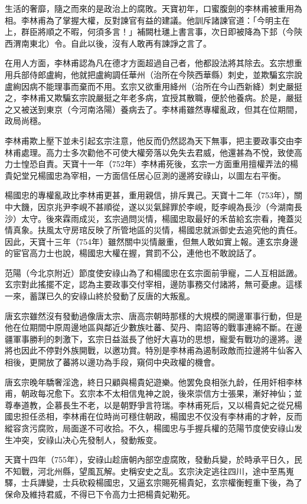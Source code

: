 生活的奢靡，隨之而來的是政治上的腐敗。天寶初年，口蜜腹劍的李林甫被重用為相。李林甫為了掌握大權，反對諫官有益的建議。他訓斥諸諫官道：「今明主在上，群臣將順之不暇，何須多言！」補闕杜璡上書言事，次日即被降為下邽（今陝西渭南東北）令。自此以後，沒有人敢再有諫諍之言了。

在用人方面，李林甫認為凡在德才方面超過自己者，他都設法將其除去。玄宗想重用兵部侍郎盧絢，他就把盧絢調任華州（治所在今陝西華縣）刺史，並欺騙玄宗說盧絢因病不能理事而棄而不用。玄宗又欲重用絳州（治所在今山西新絳）刺史嚴挺之，李林甫又欺騙玄宗說嚴挺之年老多病，宜授其散職，便於他養病。於是，嚴挺之又被送到東京（今河南洛陽）養病去了。李林甫雖然專權亂政，但其在位期間，政局尚穩。

李林甫欺上壓下並未引起玄宗注意，他反而仍然認為天下無事，把主要政事交由李林甫處理。高力士多次勸他不可使大權旁落以免失去君威，他還甚為不悅，致使高力士惶恐自責。天寶十一年（752年）李林甫死後，玄宗一方面重用擅權弄法的楊貴妃堂兄楊國忠為宰相，一方面信任居心叵測的邊將安祿山，以圖左右平衡。

楊國忠的專權亂政比李林甫更甚，重用親信，排斥異己。天寶十二年（753年），關中大饑，因京兆尹李峴不甚順從，遂以災氣歸罪於李峴，貶李峴為長沙（今湖南長沙）太守。後來霖雨成災，玄宗過問災情，楊國忠取最好的禾苗給玄宗看，掩蓋災情真象。扶風太守房琯反映了所管地區的災情，楊國忠就派御史去追究他的責任。因此，天寶十三年（754年）雖然關中災情嚴重，但無人敢如實上報。連玄宗身邊的宦官高力士也說，楊國忠大權在握，賞罰不公，連他也不敢說話了。

范陽（今北京附近）節度使安祿山為了和楊國忠在玄宗面前爭寵，二人互相詆譭。玄宗對此搖擺不定，認為主要政事交付宰相，邊防事務交付諸將，無可憂慮。這樣一來，蓄謀已久的安祿山終於發動了反唐的大叛亂。

唐玄宗雖然沒有發動過像唐太宗、唐高宗朝時那樣的大規模的開邊軍事行動，但是他在位期間中原周邊地區與鄰近少數族吐蕃、契丹、南詔等的戰事連綿不斷。在邊疆軍事勝利的刺激下，玄宗日益滋長了他好大喜功的思想，寵愛有戰功的邊將。邊將也因此不停對外族開戰，以邀功賞。特別是李林甫為遏制政敵而拉邊將牛仙客入相後，更開放了蕃將以邊功為手段，窺伺中央政權的機會。

唐玄宗晚年驕奢淫逸，終日只顧與楊貴妃遊樂。他罢免良相张九龄，任用奸相李林甫，朝政每况愈下。玄宗本不太相信鬼神之說，後來崇信方士張果，漸好神仙；並尊奉道教，企慕長生不老，以是朝野爭言符瑞。李林甫死后，又以楊貴妃之從兄楊國忠担任丞相，李林甫在位時尚可穩住朝政，楊國忠不仅没有李林甫的才幹，反而縱容贪污腐败，局面遂不可收拾。不久，楊國忠与手握兵權的范陽节度使安祿山发生冲突，安祿山决心先發制人，發動叛变。

天寶十四年（755年），安祿山趁唐朝內部空虛腐敗，發動兵變，於時承平日久，民不知戰，河北州縣，望風瓦解。史稱安史之乱。玄宗決定逃往四川，途中至馬嵬驛，士兵譁變，士兵砍殺楊國忠，又逼玄宗賜死楊貴妃，玄宗權衡輕重下後，為了保命及維持君威，不得已下令高力士把楊貴妃勒死。

